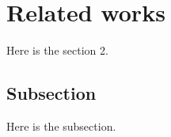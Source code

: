 \section{Related works} \label{sec:related_works}

Here is the section 2.

\subsection{Subsection}

Here is the subsection.